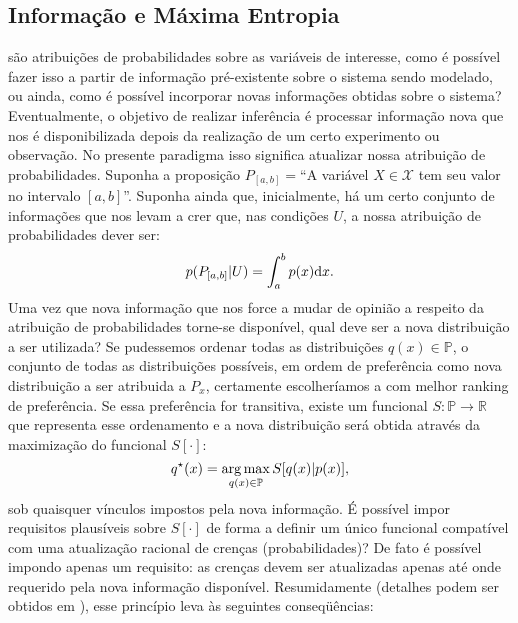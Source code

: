 \subsection{Informação e Máxima Entropia}
 são atribuições de probabilidades sobre as variáveis de interesse, como é possível fazer isso a partir de informação pré-existente sobre o sistema sendo modelado, ou ainda, como é possível incorporar novas informações obtidas sobre o sistema? Eventualmente, o objetivo de realizar inferência é processar informação nova que nos é disponibilizada depois da realização de um certo experimento ou observação. No presente paradigma isso significa atualizar nossa atribuição de probabilidades. Suponha a proposição $P_{[a,b]} =$``A variável $X\in \mathcal{X}$ tem seu valor no intervalo $[a,b]$''. Suponha ainda que, inicialmente, há um certo conjunto de informações que nos levam a crer que, nas condições $U$, a nossa atribuição de probabilidades dever ser:
\[
 p(P_{[a,b]} | U ) = \int_a^b p(x) \mathrm{d} x.
\]
Uma vez que nova informação que nos force a mudar de opinião a respeito da atribuição de probabilidades torne-se disponível, qual deve ser a nova distribuição a ser utilizada? Se pudessemos ordenar todas as distribuições $q(x) \in \mathbb{P}$, o conjunto de todas as distribuições possíveis, em ordem de preferência como nova distribuição a ser atribuida a $P_x$, certamente escolheríamos a com melhor ranking de preferência. Se essa preferência for transitiva, existe um funcional $S:\mathbb{P}\to\mathbb{R}$ que representa esse ordenamento e a nova distribuição será obtida através da maximização do funcional $S[\cdot]$:
\[
 q^{\star}(x) = \operatorname*{arg\,max}_{q(x) \in \mathbb{P}} S[q(x) | p(x)], 
\]
sob quaisquer vínculos impostos pela nova informação. É possível impor requisitos plausíveis sobre $S[\cdot]$ de forma a definir um único funcional compatível com uma atualização racional de crenças (probabilidades)? De fato é possível impondo apenas um requisito: as crenças devem ser atualizadas apenas até onde requerido pela nova informação disponível. Resumidamente (detalhes podem ser obtidos em \citet{ACaticha2008}), esse princípio leva às seguintes conseqüências:
